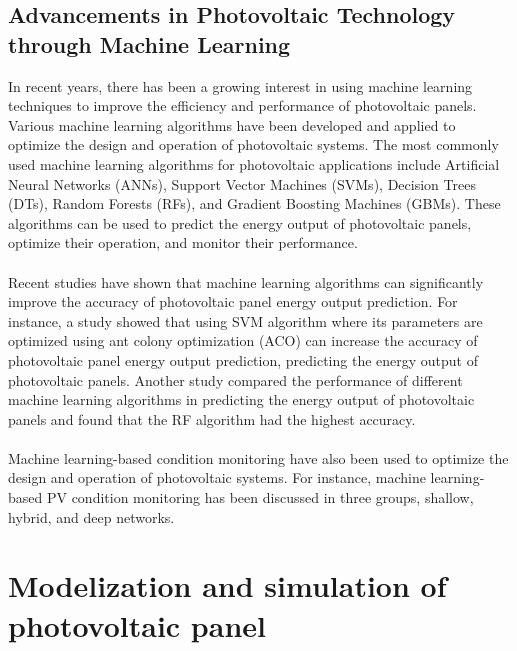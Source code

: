 \documentclass{report}
\begin{document}
\subsection{Advancements in Photovoltaic Technology through Machine Learning}
In recent years, there has been a growing interest in using machine learning techniques to improve the efficiency and performance of photovoltaic panels. Various machine learning algorithms have been developed and applied to optimize the design and operation of photovoltaic systems. The most commonly used machine learning algorithms for photovoltaic applications include Artificial Neural Networks (ANNs), Support Vector Machines (SVMs), Decision Trees (DTs), Random Forests (RFs), and Gradient Boosting Machines (GBMs). These algorithms can be used to predict the energy output of photovoltaic panels, optimize their operation, and monitor their performance.\\
\\
Recent studies have shown that machine learning algorithms can significantly improve the accuracy of photovoltaic panel energy output prediction. For instance, a study showed that using SVM  algorithm where its parameters are optimized using ant colony optimization (ACO)  can increase  the accuracy of photovoltaic panel energy output prediction, predicting the energy output of photovoltaic panels\cite{MLPV1}. Another study compared the performance of different machine learning algorithms in predicting the energy output of photovoltaic panels and found that the RF algorithm had the highest accuracy\cite{MLPV2}.\\
\\
Machine learning-based condition monitoring  have also been used to optimize the design and operation of photovoltaic systems. For instance,  machine learning-based PV condition monitoring has been discussed in three groups, shallow, hybrid, and deep networks\cite{MLPV}.
\section{Modelization and simulation of photovoltaic panel}
\end{document}
